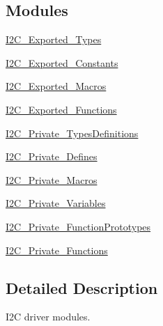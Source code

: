 \subsection*{Modules}
\begin{DoxyCompactItemize}
\item 
\hyperlink{group___i2_c___exported___types}{I2\+C\+\_\+\+Exported\+\_\+\+Types}
\item 
\hyperlink{group___i2_c___exported___constants}{I2\+C\+\_\+\+Exported\+\_\+\+Constants}
\item 
\hyperlink{group___i2_c___exported___macros}{I2\+C\+\_\+\+Exported\+\_\+\+Macros}
\item 
\hyperlink{group___i2_c___exported___functions}{I2\+C\+\_\+\+Exported\+\_\+\+Functions}
\item 
\hyperlink{group___i2_c___private___types_definitions}{I2\+C\+\_\+\+Private\+\_\+\+Types\+Definitions}
\item 
\hyperlink{group___i2_c___private___defines}{I2\+C\+\_\+\+Private\+\_\+\+Defines}
\item 
\hyperlink{group___i2_c___private___macros}{I2\+C\+\_\+\+Private\+\_\+\+Macros}
\item 
\hyperlink{group___i2_c___private___variables}{I2\+C\+\_\+\+Private\+\_\+\+Variables}
\item 
\hyperlink{group___i2_c___private___function_prototypes}{I2\+C\+\_\+\+Private\+\_\+\+Function\+Prototypes}
\item 
\hyperlink{group___i2_c___private___functions}{I2\+C\+\_\+\+Private\+\_\+\+Functions}
\end{DoxyCompactItemize}


\subsection{Detailed Description}
I2C driver modules. 

